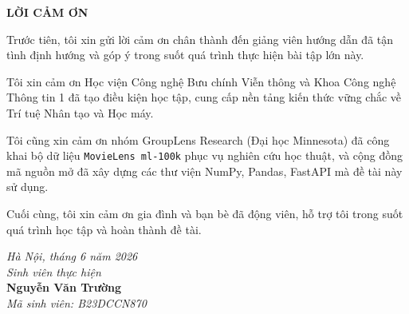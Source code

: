 \documentclass[../BTL.tex]{subfiles}
\begin{document}

\begin{center}
    \Large{\textbf{LỜI CẢM ƠN}}
\end{center}
\vspace{1cm}

Trước tiên, tôi xin gửi lời cảm ơn chân thành đến giảng viên hướng dẫn đã
tận tình định hướng và góp ý trong suốt quá trình thực hiện bài tập lớn này.

Tôi xin cảm ơn Học viện Công nghệ Bưu chính Viễn thông và Khoa Công nghệ
Thông tin 1 đã tạo điều kiện học tập, cung cấp nền tảng kiến thức vững chắc
về Trí tuệ Nhân tạo và Học máy.

Tôi cũng xin cảm ơn nhóm GroupLens Research (Đại học Minnesota) đã công
khai bộ dữ liệu \texttt{MovieLens ml-100k} phục vụ nghiên cứu học thuật, và
cộng đồng mã nguồn mở đã xây dựng các thư viện NumPy, Pandas, FastAPI mà đề
tài này sử dụng.

Cuối cùng, tôi xin cảm ơn gia đình và bạn bè đã động viên, hỗ trợ tôi trong
suốt quá trình học tập và hoàn thành đề tài.

\vspace{1cm}
\begin{flushright}
    \textit{Hà Nội, tháng 6 năm 2026}\\[0.4cm]
    \textit{Sinh viên thực hiện}\\[1.2cm]
    \textbf{Nguyễn Văn Trường}\\
    \textit{Mã sinh viên: B23DCCN870}
\end{flushright}
\end{document}
